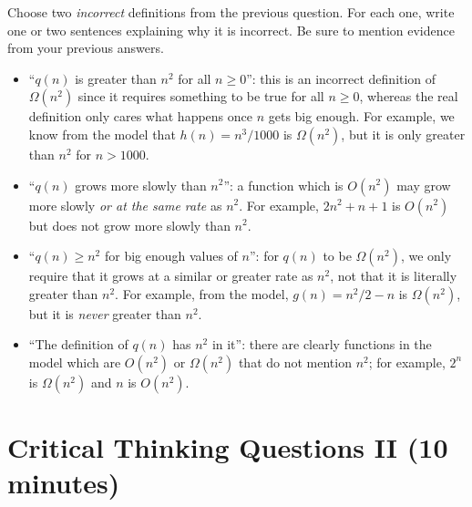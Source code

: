 \documentclass{tufte-handout}
\begin{document}
\begin{questions}
\item \label{q:incorrect} Choose two \emph{incorrect} definitions from
  the previous question.  For each one, write one or two sentences
  explaining why it is incorrect.  Be sure to mention evidence from
  your previous answers.
  \begin{answer}
    \begin{itemize}
    \item ``$q(n)$ is greater than $n^2$ for all $n \geq 0$'': this is
      an incorrect definition of $\Omega(n^2)$ since it requires
      something to be true for all $n \geq 0$, whereas the real
      definition only cares what happens once $n$ gets big enough.
      For example, we know from the model that $h(n) = n^3/1000$ is
      $\Omega(n^2)$, but it is only greater than $n^2$ for $n > 1000$.
    \item ``$q(n)$ grows more slowly than $n^2$'': a function which is
      $O(n^2)$ may grow more slowly \emph{or at the same rate} as
      $n^2$.  For example, $2n^2 + n + 1$ is $O(n^2)$ but does not
      grow more slowly than $n^2$.
    \item ``$q(n) \geq n^2$ for big enough values of $n$'': for $q(n)$
      to be $\Omega(n^2)$, we only require that it grows at a similar
      or greater rate as $n^2$, not that it is literally greater than
      $n^2$.  For example, from the model, $g(n) = n^2/2 - n$ is
      $\Omega(n^2)$, but it is \emph{never} greater than $n^2$.
    \item ``The definition of $q(n)$ has $n^2$ in it'': there are
      clearly functions in the model which are $O(n^2)$ or
      $\Omega(n^2)$ that do not mention $n^2$; for example, $2^n$ is
      $\Omega(n^2)$ and $n$ is $O(n^2)$.
    \end{itemize}
  \end{answer}
\end{questions}

\pause

\section{Critical Thinking Questions II (10 minutes)}
\end{document}
